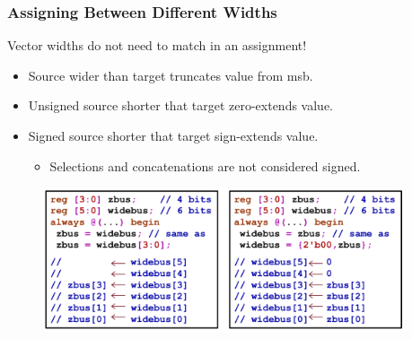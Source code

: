 \documentclass[t, notes, xcolor=table]{beamer}
\begin{document}
\begin{frame}
\frametitle{Assigning Between Different Widths}
Vector widths do not need to match in an assignment!
\begin{itemize}
\item Source wider than target truncates value from msb.
\item Unsigned source shorter that target zero-extends value.
\item Signed source shorter that target sign-extends value.
\begin{itemize}
	\item Selections and concatenations are not considered signed.
\end{itemize}
\end{itemize}
\begin{figure}[H!]
    \includegraphics[width=0.95\textwidth]{img/04_width.png}
\end{figure}

\end{frame}
\end{document}
